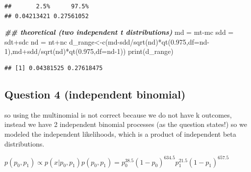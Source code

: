 \documentclass[
]{book}
\newenvironment{Shaded}{\begin{snugshade}}{\end{snugshade}}
\newcommand{\AttributeTok}[1]{\textcolor[rgb]{0.77,0.63,0.00}{#1}}
\newcommand{\DecValTok}[1]{\textcolor[rgb]{0.00,0.00,0.81}{#1}}
\newcommand{\DocumentationTok}[1]{\textcolor[rgb]{0.56,0.35,0.01}{\textbf{\textit{#1}}}}
\newcommand{\FloatTok}[1]{\textcolor[rgb]{0.00,0.00,0.81}{#1}}
\newcommand{\FunctionTok}[1]{\textcolor[rgb]{0.00,0.00,0.00}{#1}}
\newcommand{\NormalTok}[1]{#1}
\newcommand{\OtherTok}[1]{\textcolor[rgb]{0.56,0.35,0.01}{#1}}
\newcommand{\SpecialCharTok}[1]{\textcolor[rgb]{0.00,0.00,0.00}{#1}}
\theoremstyle{definition}
\theoremstyle{definition}
\theoremstyle{definition}
\theoremstyle{definition}
\theoremstyle{remark}
\begin{document}
\begin{verbatim}
##       2.5%      97.5% 
## 0.04213421 0.27561052
\end{verbatim}

\begin{Shaded}
\begin{Highlighting}[]
  \DocumentationTok{\#\# theoretical (two independent t distributions)}
\NormalTok{  md }\OtherTok{=}\NormalTok{ mt}\SpecialCharTok{{-}}\NormalTok{mc}
\NormalTok{  sdd }\OtherTok{=}\NormalTok{ sdt}\SpecialCharTok{+}\NormalTok{sdc}
\NormalTok{  nd }\OtherTok{=}\NormalTok{ nt}\SpecialCharTok{+}\NormalTok{nc}
\NormalTok{  d\_range}\OtherTok{\textless{}{-}}\FunctionTok{c}\NormalTok{(md}\SpecialCharTok{{-}}\NormalTok{sdd}\SpecialCharTok{/}\FunctionTok{sqrt}\NormalTok{(nd)}\SpecialCharTok{*}\FunctionTok{qt}\NormalTok{(}\FloatTok{0.975}\NormalTok{,}\AttributeTok{df=}\NormalTok{nd}\DecValTok{{-}1}\NormalTok{),md}\SpecialCharTok{+}\NormalTok{sdd}\SpecialCharTok{/}\FunctionTok{sqrt}\NormalTok{(nd)}\SpecialCharTok{*}\FunctionTok{qt}\NormalTok{(}\FloatTok{0.975}\NormalTok{,}\AttributeTok{df=}\NormalTok{nd}\DecValTok{{-}1}\NormalTok{))}
  \FunctionTok{print}\NormalTok{(d\_range)}
\end{Highlighting}
\end{Shaded}

\begin{verbatim}
## [1] 0.04381525 0.27618475
\end{verbatim}

\hypertarget{question-4-independent-binomial}{%
\subsection*{Question 4 (independent binomial)}\label{question-4-independent-binomial}}

so using the multinomial is not correct because we do not have k outcomes, instead we have 2 independent binomial processes (as the question states!) so we modeled the independent likelihoods, which is a product of independent beta distributions.

\(p(p_0,p_1) \propto p(x| p_0,p_1)p(p_0,p_1) = p_0^{38.5}(1-p_0)^{634.5}p_1^{21.5}(1-p_1)^{657.5}\)
\end{document}
